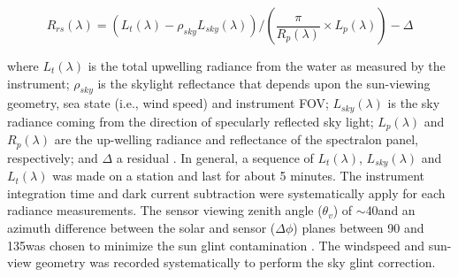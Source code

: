 \documentclass[essd, manuscript]{copernicus}
\begin{document}
\begin{equation}
    \label{eq:Rrs_above}
    R_{rs}(\lambda) = (L_t(\lambda) - \rho_{sky}L_{sky}(\lambda)) / \left( \frac{\pi}{R_p(\lambda)}\times L_p(\lambda) \right) - \Delta
\end{equation}

where $L_t(\lambda)$ is the total upwelling radiance from the water as measured by the instrument; $\rho_{sky}$ is the skylight reflectance that depends upon the sun-viewing geometry, sea state (i.e., wind speed) and instrument FOV; $L_{sky}(\lambda)$ is the sky radiance coming from the direction of specularly reflected sky light; $L_p(\lambda)$ and $R_p(\lambda)$ are the up-welling radiance and reflectance of the spectralon panel, respectively; and $\Delta$ a residual . In general, a sequence of $L_t(\lambda)$, $L_{sky}(\lambda)$  and $L_t(\lambda)$ was made on a station and last for about 5 minutes. The instrument integration time and dark current subtraction were systematically apply for each radiance measurements. The sensor viewing zenith angle ($\theta_v$) of $\sim$40\degree and an azimuth difference between the solar and sensor ($\Delta\phi$) planes between 90 and 135\degree was chosen to minimize the sun glint contamination \citep{Mobley1999}. The windspeed and sun-view geometry was recorded systematically to perform the sky glint correction.   \\
\end{document}
